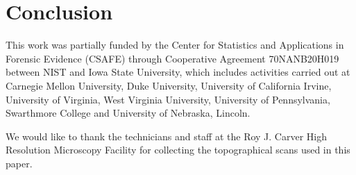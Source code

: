 \documentclass[reprint]{JASA}
\begin{document}
\hypertarget{conclusion}{%
\section{Conclusion}\label{conclusion}}

\begin{acknowledgments}
This work was partially funded by the Center for Statistics and
Applications in Forensic Evidence (CSAFE) through Cooperative Agreement
70NANB20H019 between NIST and Iowa State University, which includes
activities carried out at Carnegie Mellon University, Duke University,
University of California Irvine, University of Virginia, West Virginia
University, University of Pennsylvania, Swarthmore College and
University of Nebraska, Lincoln.

We would like to thank the technicians and staff at the Roy J. Carver
High Resolution Microscopy Facility for collecting the topographical
scans used in this paper.

\end{acknowledgments}
\end{document}
